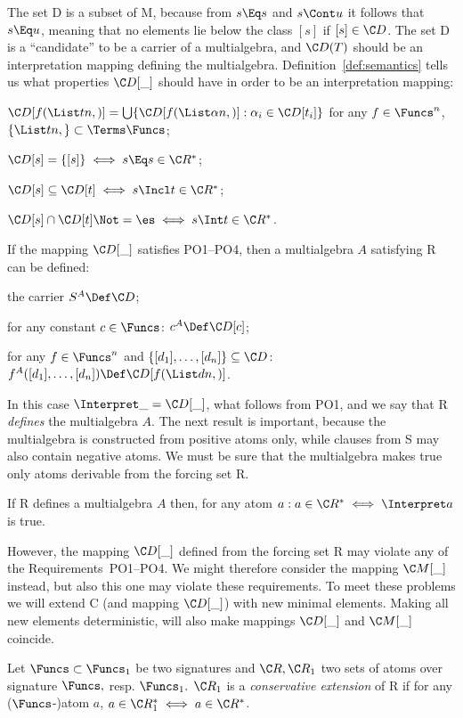 The set \C D is a subset of \C M, because from \(s\Eq s\) and \(s\Cont u\)
it follows that \(s\Eq u\), meaning that no elements lie below the class \([s]\) if
\([s]\in\C D\). The set \C D is a ``candidate'' to be a carrier of a
multialgebra, and \(\C D(T)\) should be an interpretation mapping defining the
multialgebra.  Definition~\ref {def:semantics} tells us what properties
$\C D[\_]$ should have in order to be an interpretation mapping:
\begin{description}\MyLPar
\item [PO1.] \(\C D [f(\List tn,)] =
\bigcup\{\C D [f(\List\alpha n,)]:\alpha_i\in \C D [t_i]\}\) 
for any \(f\in \Funcs^n\), \(\{\List tn,\}\subset
\Terms\Funcs\);
\item [PO2.] \(\C D [s]=\{[s]\}\iff s\Eq s\in\C R^\ast\);
\item [PO3.] \(\C D [s]\subseteq \C D [t] \iff s\Incl t\in\C R^\ast\);
\item [PO4.] \(\C D [s]\cap \C D [t]\Not=\es \iff s\Int t\in\C R^\ast\).
\end{description}
\noindent If the mapping \(\C D[\_]\) satisfies PO1--PO4, then a multialgebra $A$
satisfying \C R can be defined:
\begin{description}\MyLPar
\item[MA1.] the carrier \(S^A\Def \C D\);
\item[MA2.] for any constant \(c\in\Funcs\): \(c^A\Def \C D[c]\);
\item[MA3.] for any \(f\in\Funcs^n\) and
\(\{[d_1] ,\ldots, [d_n]\}\subseteq\C D\):
\(f^A([d_1] ,\ldots, [d_n])\Def \C D[f(\List dn,)]\).
\end{description}
In this case \(\Interpret\_=\C D[\_]\), what follows from PO1, and we say that
\C R {\em defines} the multialgebra $A$. The next result is important, because
the multialgebra is constructed from positive atoms only, while clauses from
\C S may also contain negative atoms. We must be sure that the multialgebra
makes true only atoms derivable from the forcing set \C R.
\begin{LEMMA} \label{le:MA-exact}
If \C R defines a multialgebra $A$ then, for any atom \(a :
a\in\C R^\ast \iff \Interpret a\) is true.
\end{LEMMA}
However, the mapping $\C D[\_]$ defined from the forcing set \C R may violate any
of the Requirements~PO1--PO4. We might therefore consider the mapping \(\C M[\_]\)
instead, but also this one may violate these requirements.
To meet these problems we will extend
 \C C (and mapping \(\C D[\_]\)) with new minimal elements. Making
 all new elements deterministic, will also make mappings \(\C D[\_]\) and
\(\C M[\_]\) coincide.
\begin{DEFINITION} \label{def:conservative-extension}
Let \(\Funcs\subset\Funcs_1\) be two signatures and \(\C R, \C R_1\) two sets of
atoms over signature $\Funcs,$ resp. \(\Funcs_1.\)
\(\C R_1\) is a {\em conservative extension} of \C R if for any 
($\Funcs$-)atom \(a\), \(a\in\C R_1^\ast\iff a\in\C R^\ast\).
\end{DEFINITION} 

